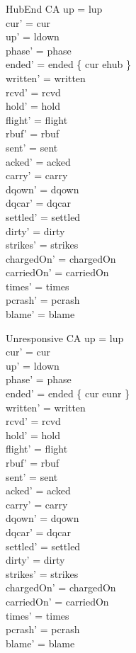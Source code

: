 \documentclass[a4paper,10pt,fleqn]{article}
\begin{document}
\begin{schema}{HubEnd}
  \Delta CA
\where
  up = lup \\
  cur' = cur \\
  up' = ldown \\
  phase' = phase \\
  ended' = ended \oplus \{ cur \mapsto ehub \} \\
  written' = written \\
  rcvd' = rcvd \\
  hold' = hold \\
  flight' = flight \\
  rbuf' = rbuf \\
  sent' = sent \\
  acked' = acked \\
  carry' = carry \\
  dqown' = dqown \\
  dqcar' = dqcar \\
  settled' = settled \\
  dirty' = dirty \\
  strikes' = strikes \\
  chargedOn' = chargedOn \\
  carriedOn' = carriedOn \\
  times' = times \\
  pcrash' = pcrash \\
  blame' = blame
\end{schema}

\begin{schema}{Unresponsive}
  \Delta CA
\where
  up = lup \\
  cur' = cur \\
  up' = ldown \\
  phase' = phase \\
  ended' = ended \oplus \{ cur \mapsto eunr \} \\
  written' = written \\
  rcvd' = rcvd \\
  hold' = hold \\
  flight' = flight \\
  rbuf' = rbuf \\
  sent' = sent \\
  acked' = acked \\
  carry' = carry \\
  dqown' = dqown \\
  dqcar' = dqcar \\
  settled' = settled \\
  dirty' = dirty \\
  strikes' = strikes \\
  chargedOn' = chargedOn \\
  carriedOn' = carriedOn \\
  times' = times \\
  pcrash' = pcrash \\
  blame' = blame
\end{schema}
\end{document}
